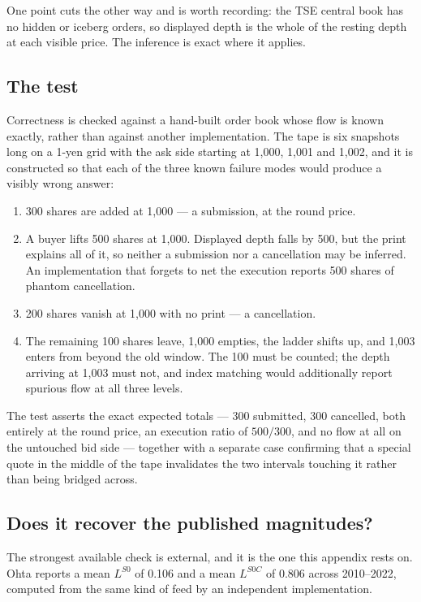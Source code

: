 One point cuts the other way and is worth recording: the TSE central book has no
hidden or iceberg orders, so displayed depth is the whole of the resting depth at
each visible price. The inference is exact where it applies.

\subsection{The test}
\label{app:ladder-test}

Correctness is checked against a hand-built order book whose flow is known
exactly, rather than against another implementation. The tape is six snapshots
long on a 1-yen grid with the ask side starting at 1{,}000, 1{,}001 and 1{,}002,
and it is constructed so that each of the three known failure modes would produce
a visibly wrong answer:

\begin{enumerate}[nosep]
\item 300 shares are added at 1{,}000 --- a submission, at the round price.
\item A buyer lifts 500 shares at 1{,}000. Displayed depth falls by 500, but the
      print explains all of it, so neither a submission nor a cancellation may be
      inferred. An implementation that forgets to net the execution reports 500
      shares of phantom cancellation.
\item 200 shares vanish at 1{,}000 with no print --- a cancellation.
\item The remaining 100 shares leave, 1{,}000 empties, the ladder shifts up, and
      1{,}003 enters from beyond the old window. The 100 must be counted; the
      depth arriving at 1{,}003 must not, and index matching would additionally
      report spurious flow at all three levels.
\end{enumerate}

The test asserts the exact expected totals --- 300 submitted, 300 cancelled, both
entirely at the round price, an execution ratio of $500/300$, and no flow at all
on the untouched bid side --- together with a separate case confirming that a
special quote in the middle of the tape invalidates the two intervals touching it
rather than being bridged across.

\subsection{Does it recover the published magnitudes?}

The strongest available check is external, and it is the one this appendix rests
on. Ohta reports a mean $L^{S0}$ of 0.106 and a mean $L^{S0C}$ of 0.806 across
2010--2022, computed from the same kind of feed by an independent implementation.

